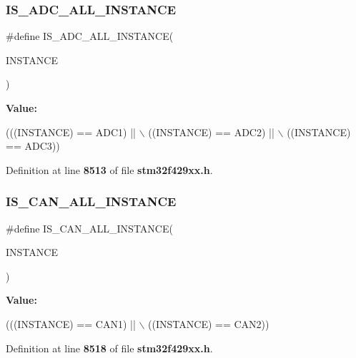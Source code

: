 \subsubsection{I\+S\+\_\+\+A\+D\+C\+\_\+\+A\+L\+L\+\_\+\+I\+N\+S\+T\+A\+N\+CE}
{\footnotesize\ttfamily \#define I\+S\+\_\+\+A\+D\+C\+\_\+\+A\+L\+L\+\_\+\+I\+N\+S\+T\+A\+N\+CE(\begin{DoxyParamCaption}\item[{}]{I\+N\+S\+T\+A\+N\+CE }\end{DoxyParamCaption})}

{\bfseries Value\+:}
\begin{DoxyCode}
(((INSTANCE) == ADC1) || \(\backslash\)
                                       ((INSTANCE) == ADC2) || \(\backslash\)
                                       ((INSTANCE) == ADC3))
\end{DoxyCode}


Definition at line \textbf{ 8513} of file \textbf{ stm32f429xx.\+h}.

\mbox{\label{group__Exported__macros_ga974dd363bcb2a5f48ec032509fd4ece3}} 
\subsubsection{I\+S\+\_\+\+C\+A\+N\+\_\+\+A\+L\+L\+\_\+\+I\+N\+S\+T\+A\+N\+CE}
{\footnotesize\ttfamily \#define I\+S\+\_\+\+C\+A\+N\+\_\+\+A\+L\+L\+\_\+\+I\+N\+S\+T\+A\+N\+CE(\begin{DoxyParamCaption}\item[{}]{I\+N\+S\+T\+A\+N\+CE }\end{DoxyParamCaption})}

{\bfseries Value\+:}
\begin{DoxyCode}
(((INSTANCE) == CAN1) || \(\backslash\)
                                       ((INSTANCE) == CAN2))
\end{DoxyCode}


Definition at line \textbf{ 8518} of file \textbf{ stm32f429xx.\+h}.

\mbox{\label{group__Exported__macros_gaa514941a7f02f65eb27450c05e4e8dd1}} 
